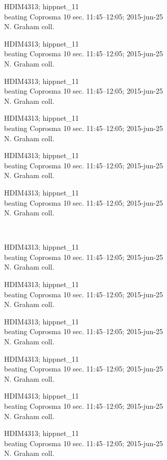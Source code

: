 \documentclass[2pt]{extarticle}
\begin{document}
\noindent
\parbox{0.16\textwidth}{\tiny \raggedright \rule[-0.3\baselineskip]{0pt}{10pt}HDIM4313; hippnet\_11\\ beating Coprosma 10 sec. 11:45--12:05; 2015-jun-25\\ N. Graham coll.}
\parbox{0.16\textwidth}{\tiny \raggedright \rule[-0.3\baselineskip]{0pt}{10pt}HDIM4313; hippnet\_11\\ beating Coprosma 10 sec. 11:45--12:05; 2015-jun-25\\ N. Graham coll.}
\parbox{0.16\textwidth}{\tiny \raggedright \rule[-0.3\baselineskip]{0pt}{10pt}HDIM4313; hippnet\_11\\ beating Coprosma 10 sec. 11:45--12:05; 2015-jun-25\\ N. Graham coll.}
\parbox{0.16\textwidth}{\tiny \raggedright \rule[-0.3\baselineskip]{0pt}{10pt}HDIM4313; hippnet\_11\\ beating Coprosma 10 sec. 11:45--12:05; 2015-jun-25\\ N. Graham coll.}
\parbox{0.16\textwidth}{\tiny \raggedright \rule[-0.3\baselineskip]{0pt}{10pt}HDIM4313; hippnet\_11\\ beating Coprosma 10 sec. 11:45--12:05; 2015-jun-25\\ N. Graham coll.}
\parbox{0.16\textwidth}{\tiny \raggedright \rule[-0.3\baselineskip]{0pt}{10pt}HDIM4313; hippnet\_11\\ beating Coprosma 10 sec. 11:45--12:05; 2015-jun-25\\ N. Graham coll.} \\ 
\vspace{0.001in} 

\noindent
\parbox{0.16\textwidth}{\tiny \raggedright \rule[-0.3\baselineskip]{0pt}{10pt}HDIM4313; hippnet\_11\\ beating Coprosma 10 sec. 11:45--12:05; 2015-jun-25\\ N. Graham coll.}
\parbox{0.16\textwidth}{\tiny \raggedright \rule[-0.3\baselineskip]{0pt}{10pt}HDIM4313; hippnet\_11\\ beating Coprosma 10 sec. 11:45--12:05; 2015-jun-25\\ N. Graham coll.}
\parbox{0.16\textwidth}{\tiny \raggedright \rule[-0.3\baselineskip]{0pt}{10pt}HDIM4313; hippnet\_11\\ beating Coprosma 10 sec. 11:45--12:05; 2015-jun-25\\ N. Graham coll.}
\parbox{0.16\textwidth}{\tiny \raggedright \rule[-0.3\baselineskip]{0pt}{10pt}HDIM4313; hippnet\_11\\ beating Coprosma 10 sec. 11:45--12:05; 2015-jun-25\\ N. Graham coll.}
\parbox{0.16\textwidth}{\tiny \raggedright \rule[-0.3\baselineskip]{0pt}{10pt}HDIM4313; hippnet\_11\\ beating Coprosma 10 sec. 11:45--12:05; 2015-jun-25\\ N. Graham coll.}
\parbox{0.16\textwidth}{\tiny \raggedright \rule[-0.3\baselineskip]{0pt}{10pt}HDIM4313; hippnet\_11\\ beating Coprosma 10 sec. 11:45--12:05; 2015-jun-25\\ N. Graham coll.} \\ 
\vspace{0.001in} 
\end{document}
